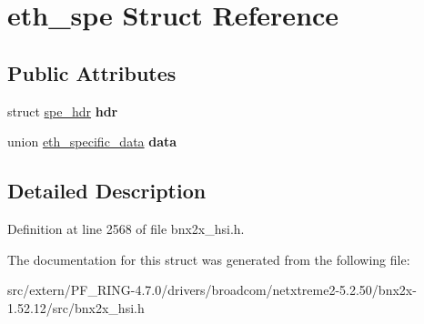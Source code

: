 \hypertarget{structeth__spe}{
\section{eth\_\-spe Struct Reference}
\label{structeth__spe}
}
\subsection*{Public Attributes}
\begin{DoxyCompactItemize}
\item 
\hypertarget{structeth__spe_ae0b326c1abb0085eae9dee763956c625}{
struct \hyperlink{structspe__hdr}{spe\_\-hdr} {\bfseries hdr}}
\label{structeth__spe_ae0b326c1abb0085eae9dee763956c625}

\item 
\hypertarget{structeth__spe_af2f87f0c9b336a3f5db95cdc18ae1280}{
union \hyperlink{unioneth__specific__data}{eth\_\-specific\_\-data} {\bfseries data}}
\label{structeth__spe_af2f87f0c9b336a3f5db95cdc18ae1280}

\end{DoxyCompactItemize}


\subsection{Detailed Description}


Definition at line 2568 of file bnx2x\_\-hsi.h.



The documentation for this struct was generated from the following file:\begin{DoxyCompactItemize}
\item 
src/extern/PF\_\-RING-\/4.7.0/drivers/broadcom/netxtreme2-\/5.2.50/bnx2x-\/1.52.12/src/bnx2x\_\-hsi.h\end{DoxyCompactItemize}
